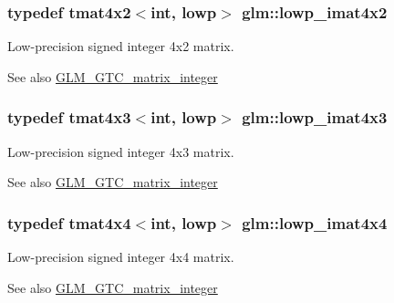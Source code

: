 \subsubsection[{lowp\+\_\+imat4x2}]{\setlength{\rightskip}{0pt plus 5cm}typedef tmat4x2$<$int, lowp$>$ {\bf glm\+::lowp\+\_\+imat4x2}}\label{group__gtc__matrix__integer_ga87e2118b22cbc6916805aafcda52a943}
Low-\/precision signed integer 4x2 matrix. \begin{DoxySeeAlso}{See also}
\hyperlink{group__gtc__matrix__integer}{G\+L\+M\+\_\+\+G\+T\+C\+\_\+matrix\+\_\+integer} 
\end{DoxySeeAlso}
\hypertarget{group__gtc__matrix__integer_ga76c201715b216ddd5d7de3c3759211f1}{}
\subsubsection[{lowp\+\_\+imat4x3}]{\setlength{\rightskip}{0pt plus 5cm}typedef tmat4x3$<$int, lowp$>$ {\bf glm\+::lowp\+\_\+imat4x3}}\label{group__gtc__matrix__integer_ga76c201715b216ddd5d7de3c3759211f1}
Low-\/precision signed integer 4x3 matrix. \begin{DoxySeeAlso}{See also}
\hyperlink{group__gtc__matrix__integer}{G\+L\+M\+\_\+\+G\+T\+C\+\_\+matrix\+\_\+integer} 
\end{DoxySeeAlso}
\hypertarget{group__gtc__matrix__integer_ga46f8dc46c3dcde8fa2e8b8f645c0d9ef}{}
\subsubsection[{lowp\+\_\+imat4x4}]{\setlength{\rightskip}{0pt plus 5cm}typedef tmat4x4$<$int, lowp$>$ {\bf glm\+::lowp\+\_\+imat4x4}}\label{group__gtc__matrix__integer_ga46f8dc46c3dcde8fa2e8b8f645c0d9ef}
Low-\/precision signed integer 4x4 matrix. \begin{DoxySeeAlso}{See also}
\hyperlink{group__gtc__matrix__integer}{G\+L\+M\+\_\+\+G\+T\+C\+\_\+matrix\+\_\+integer} 
\end{DoxySeeAlso}
\hypertarget{group__gtc__matrix__integer_ga0ff71fefa5bfab1462195c3de4f83f67}{}
